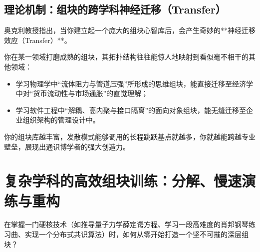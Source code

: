 \documentclass[12pt,a4paper,openany]{ctexbook}
\begin{document}
\subsection*{理论机制：组块的跨学科神经迁移（Transfer）}

奥克利教授指出，当你建立起一个庞大的组块心智库后，会产生奇妙的**神经迁移效应（Transfer）**。

你在某一领域打磨成熟的组块，其拓扑结构往往能惊人地映射到看似毫不相干的其他领域：
\begin{itemize}
    \item 学习物理学中“流体阻力与管道压强”所形成的思维组块，能直接迁移至经济学中对“货币流动性与市场通胀”的直觉理解；
    \item 学习软件工程中“解耦、高内聚与接口隔离”的面向对象组块，能无缝迁移至企业组织架构的管理设计中。
\end{itemize}
你的组块库越丰富，发散模式能够调用的长程跳跃基点就越多，你就越能跨越专业壁垒，展现出通识博学者的强大创造力。

\section{复杂学科的高效组块训练：分解、慢速演练与重构}

在掌握一门硬核技术（如推导量子力学薛定谔方程、学习一段高难度的肖邦钢琴练习曲、实现一个分布式共识算法）时，如何从零开始打造一个坚不可摧的深层组块？
\end{document}
